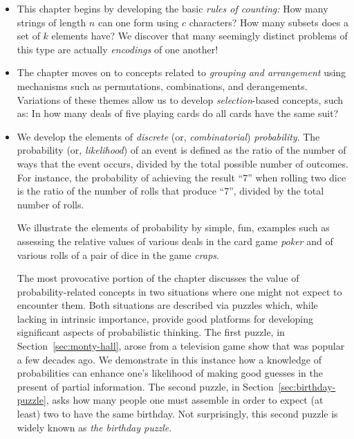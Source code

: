 \begin{itemize}
\item
This chapter begins by developing the basic {\em rules of counting:}  How many strings of length $n$ can one form using $c$ characters?  How many subsets does a set of $k$ elements have?  We discover that many seemingly distinct problems of this type are actually {\em encodings} of one another!

\item
The chapter moves on to concepts related to {\em grouping and arrangement} using mechanisms such as permutations, combinations, and derangements.  Variations of these themes allow us to develop {\em selection}-based concepts, such as: In how many deals of five playing cards do all cards have the same suit?

\item
We develop the elements of {\em discrete} (or, {\em combinatorial}) {\em probability}.  The probability (or, {\it likelihood}) of an event is defined as the ratio of the number of ways that the event occurs, divided by the total possible number of outcomes.  For instance, the probability of achieving the result ``$7$'' when rolling two dice is the ratio of the number of rolls that produce ``$7$'', divided by the total number of rolls.

\smallskip

We illustrate the elements of probability by simple, fun, examples such as assessing the relative values of various deals in the card game {\it poker} and of various rolls of a pair of dice in the game {\it craps}.

\smallskip

The most provocative portion of the chapter discusses the value of probability-related concepts in two situations where one might not expect to encounter them.  Both situations are described via puzzles which, while lacking in intrinsic importance, provide good platforms for developing significant aspects of probabilistic thinking.  The first puzzle, in Section~\ref{sec:monty-hall}, arose from a television game show that was popular a few decades ago.  We demonstrate in this
instance how a knowledge of probabilities can enhance one's likelihood of making good guesses in the present of partial information.  The second puzzle, in Section~\ref{sec:birthday-puzzle}, asks how many people one must assemble in order to expect (at least) two to have the same birthday. Not surprisingly, this second puzzle is widely known as {\it the birthday puzzle}.


\end{itemize}
